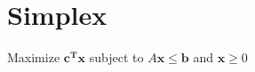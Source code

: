     
    \section{Simplex}
    Maximize ${\textstyle \mathbf {c^{T}} \mathbf {x} }$
subject to ${\displaystyle A\mathbf {x} \leq \mathbf {b} }$ and ${\displaystyle \mathbf {x} \geq 0}$
